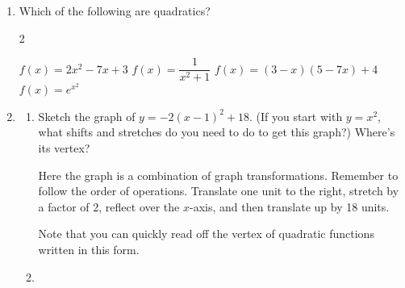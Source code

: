 \documentclass{article}
\begin{document}
\begin{enumerate}[resume]
\item 
  \begin{problem}
    Which of the following are quadratics?
  \end{problem}

  \begin{multicols}{2}
    \begin{enumerate}[label=\maybecircle{\Alph*.}]
    \circleitem $f(x) = 2x^2 - 7x + 3$
    \plainitem $f(x) = \dfrac{1}{x^2 + 1}$
    \circleitem $f(x) = (3 - x)(5 - 7x) + 4$
    \plainitem $f(x) = e^{x^2}$
    \end{enumerate}
  \end{multicols}


\item  


  \begin{enumerate}
  \item \label{sketch-quadratic-1}


    \begin{problem}[\vfill]
      Sketch the graph of $y = -2 (x - 1)^2 + 18$.  (If you start with $y = x^2$, what shifts and stretches do you need to do to get this graph?) Where's its vertex?
    \end{problem}

    \begin{solution} 
      Here the graph is a combination of graph transformations. Remember to follow the order of operations. Translate one unit to the right, stretch by a factor of 2, reflect over the $x$-axis, and then translate up by 18 units.


      Note that you can quickly read off the vertex of quadratic functions written in this form.
    \end{solution}

  \item


\end{enumerate}
\end{enumerate}
\end{document}
